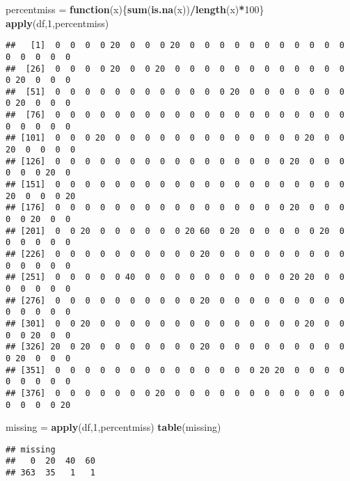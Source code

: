 \documentclass[
]{article}
\newenvironment{Shaded}{\begin{snugshade}}{\end{snugshade}}
\newcommand{\ControlFlowTok}[1]{\textcolor[rgb]{0.13,0.29,0.53}{\textbf{#1}}}
\newcommand{\DecValTok}[1]{\textcolor[rgb]{0.00,0.00,0.81}{#1}}
\newcommand{\KeywordTok}[1]{\textcolor[rgb]{0.13,0.29,0.53}{\textbf{#1}}}
\newcommand{\NormalTok}[1]{#1}
\newcommand{\OperatorTok}[1]{\textcolor[rgb]{0.81,0.36,0.00}{\textbf{#1}}}
\newcommand{\StringTok}[1]{\textcolor[rgb]{0.31,0.60,0.02}{#1}}
\begin{document}
\begin{Shaded}
\begin{Highlighting}[]
\NormalTok{percentmiss =}\StringTok{ }\ControlFlowTok{function}\NormalTok{(x)\{}\KeywordTok{sum}\NormalTok{(}\KeywordTok{is.na}\NormalTok{(x))}\OperatorTok{/}\KeywordTok{length}\NormalTok{(x)}\OperatorTok{*}\DecValTok{100}\NormalTok{\}}
\KeywordTok{apply}\NormalTok{(df,}\DecValTok{1}\NormalTok{,percentmiss)}
\end{Highlighting}
\end{Shaded}

\begin{verbatim}
##   [1]  0  0  0  0 20  0  0  0 20  0  0  0  0  0  0  0  0  0  0  0  0  0  0  0  0
##  [26]  0  0  0  0 20  0  0 20  0  0  0  0  0  0  0  0  0  0  0  0  0 20  0  0  0
##  [51]  0  0  0  0  0  0  0  0  0  0  0  0 20  0  0  0  0  0  0  0  0 20  0  0  0
##  [76]  0  0  0  0  0  0  0  0  0  0  0  0  0  0  0  0  0  0  0  0  0  0  0  0  0
## [101]  0  0  0 20  0  0  0  0  0  0  0  0  0  0  0  0  0 20  0  0 20  0  0  0  0
## [126]  0  0  0  0  0  0  0  0  0  0  0  0  0  0  0  0 20  0  0  0  0  0  0 20  0
## [151]  0  0  0  0  0  0  0  0  0  0  0  0  0  0  0  0  0  0  0  0 20  0  0  0 20
## [176]  0  0  0  0  0  0  0  0  0  0  0  0  0  0  0  0 20  0  0  0  0  0 20  0  0
## [201]  0  0 20  0  0  0  0  0  0 20 60  0 20  0  0  0  0  0 20  0  0  0  0  0  0
## [226]  0  0  0  0  0  0  0  0  0  0 20  0  0  0  0  0  0  0  0  0  0  0  0  0  0
## [251]  0  0  0  0  0 40  0  0  0  0  0  0  0  0  0  0 20 20  0  0  0  0  0  0  0
## [276]  0  0  0  0  0  0  0  0  0  0 20  0  0  0  0  0  0  0  0  0  0  0  0  0  0
## [301]  0  0 20  0  0  0  0  0  0  0  0  0  0  0  0  0  0 20  0  0  0  0 20  0  0
## [326] 20  0 20  0  0  0  0  0  0  0 20  0  0  0  0  0  0  0  0  0  0 20  0  0  0
## [351]  0  0  0  0  0  0  0  0  0  0  0  0  0  0 20 20  0  0  0  0  0  0  0  0  0
## [376]  0  0  0  0  0  0  0 20  0  0  0  0  0  0  0  0  0  0  0  0  0  0  0  0 20
\end{verbatim}

\begin{Shaded}
\begin{Highlighting}[]
\NormalTok{missing =}\StringTok{ }\KeywordTok{apply}\NormalTok{(df,}\DecValTok{1}\NormalTok{,percentmiss)}
\KeywordTok{table}\NormalTok{(missing)}
\end{Highlighting}
\end{Shaded}

\begin{verbatim}
## missing
##   0  20  40  60 
## 363  35   1   1
\end{verbatim}
\end{document}
